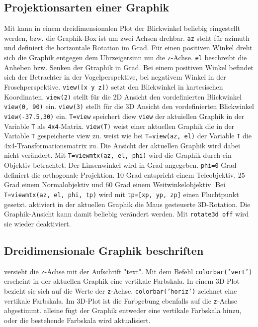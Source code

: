 \subsection{Projektionsarten einer Graphik}
Mit  kann in einem dreidimensionalen Plot der Blickwinkel beliebig eingestellt werden, bzw. die Graphik-Box ist um zwei Achsen drehbar. {\color{red}\texttt{az}} steht für azimuth und definiert die horizontale Rotation im Grad. Für einen positiven Winkel dreht sich die Graphik entgegen dem Uhrzeigersinn um die \texttt{z}-Achse. {\color{red}\texttt{el}} beschreibt die Anheben bzw. Senken der Gtraphik in Grad. Bei einem positiven Winkel befindet sich der Betrachter in der Vogelperspektive, bei negativem Winkel in der Froschperspektive. {\color{red}\texttt{view([x y z])}} setzt den Blickwinkel in kartesischen Koordinaten. {\color{red}\texttt{view(2)}} stellt für die 2D Ansicht den vordefinierten Blickwinkel {\color{red}\texttt{view(0, 90)}} ein. {\color{red}\texttt{view(3)}} stellt für die 3D Ansicht den vordefinierten Blickwinkel {\color{red}\texttt{view(-37.5,30)}} ein. {\color{red}\texttt{T=view}} speichert diew \texttt{view} der aktuiellen Graphik in der Variable \texttt{T} als \texttt{4x4}-Matrix. {\color{red}\texttt{view(T)}} weist einer aktuellen Graphik die in der Variable \texttt{T} gespeicherte view zu.
\newline\newline
{} weist wie bei {\color{red}\texttt{T=view(az, el)}} der Variable \texttt{T} die 4x4-Transformationsmatrix zu. Die Ansicht der aktuellen Graphik wird dabei nicht verändert. Mit {\color{red}\texttt{T=viewmtx(az, el, phi)}} wird die Graphik durch ein Objektiv betrachtet. Der Linsenwinkel wird in Grad angegeben. \texttt{phi=0} Grad definiert die orthogonale Projektion. 10 Grad entspricht einem Teleobjektiv, 25 Grad einem Normalobjektiv und 60 Grad einem Weitwinkelobjektiv. Bei {\color{red}\texttt{T=viewmtx(az, el, phi, tp)}} wird mit \texttt{tp=[xp, yp, zp]} einen Fluchtpunkt gesetzt.
\newline\newline
{} aktiviert in der aktuellen Graphik die Maus gesteuerte 3D-Rotation. Die Graphik-Ansicht kann damit beliebig verändert werden. Mit {\color{red}\texttt{rotate3d off}} wird sie wieder deaktiviert. 
\subsection{Dreidimensionale Graphik beschriften}
 versieht die \texttt{z}-Achse mit der Aufschrift "text". Mit dem Befehl {\color{red}\texttt{colorbar('vert')}} erscheint in der aktuellen Graphik eine vertikale Farbskala. In einem 3D-Plot bezieht sie sich auf die Werte der \texttt{z}-Achse. {\color{red}\texttt{colorbar('horiz')}} zeichnet eine vertikale Farbskala. Im 3D-Plot ist die Farbgebung ebenfalls auf die \texttt{z}-Achse abgestimmt.  alleine fügt der Graphik entweder eine vertikale Farbskala hinzu, oder die bestehende Farbskala wird aktualisiert.
